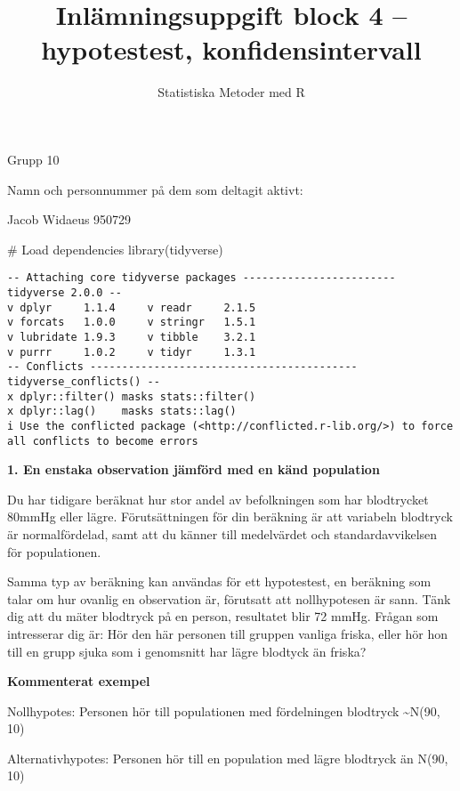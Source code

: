 \documentclass[
  letterpaper,
  DIV=11,
  numbers=noendperiod]{scrartcl}
\title{Inlämningsuppgift block 4 -- hypotestest, konfidensintervall}
\author{Statistiska Metoder med R}
\date{}
\newenvironment{Shaded}{\begin{snugshade}}{\end{snugshade}}
\newcommand{\CommentTok}[1]{\textcolor[rgb]{0.37,0.37,0.37}{#1}}
\newcommand{\FunctionTok}[1]{\textcolor[rgb]{0.28,0.35,0.67}{#1}}
\newcommand{\NormalTok}[1]{\textcolor[rgb]{0.00,0.23,0.31}{#1}}
\begin{document}
\maketitle

Grupp 10

Namn och personnummer på dem som deltagit aktivt:

Jacob Widaeus 950729

\hfill\break

\hfill\break

\begin{Shaded}
\begin{Highlighting}[]
\CommentTok{\# Load dependencies}
\FunctionTok{library}\NormalTok{(tidyverse)}
\end{Highlighting}
\end{Shaded}

\begin{verbatim}
-- Attaching core tidyverse packages ------------------------ tidyverse 2.0.0 --
v dplyr     1.1.4     v readr     2.1.5
v forcats   1.0.0     v stringr   1.5.1
v lubridate 1.9.3     v tibble    3.2.1
v purrr     1.0.2     v tidyr     1.3.1
-- Conflicts ------------------------------------------ tidyverse_conflicts() --
x dplyr::filter() masks stats::filter()
x dplyr::lag()    masks stats::lag()
i Use the conflicted package (<http://conflicted.r-lib.org/>) to force all conflicts to become errors
\end{verbatim}

\textbf{1. En enstaka observation jämförd med en känd population}

Du har tidigare beräknat hur stor andel av befolkningen som har
blodtrycket 80mmHg eller lägre. Förutsättningen för din beräkning är att
variabeln blodtryck är normalfördelad, samt att du känner till
medelvärdet och standardavvikelsen för populationen.

Samma typ av beräkning kan användas för ett hypotestest, en beräkning
som talar om hur ovanlig en observation är, förutsatt att nollhypotesen
är sann. Tänk dig att du mäter blodtryck på en person, resultatet blir
72 mmHg. Frågan som intresserar dig är: Hör den här personen till
gruppen vanliga friska, eller hör hon till en grupp sjuka som i
genomsnitt har lägre blodtyck än friska?

\textbf{Kommenterat exempel}

Nollhypotes: Personen hör till populationen med fördelningen blodtryck
\textasciitilde N(90, 10)

Alternativhypotes: Personen hör till en population med lägre blodtryck
än N(90, 10)
\end{document}
